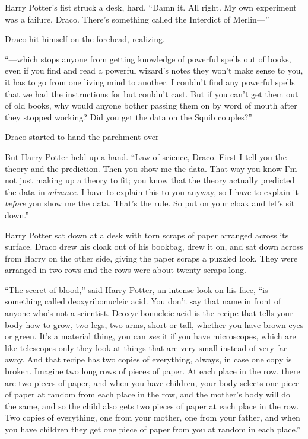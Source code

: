 Harry Potter’s fist struck a desk, hard. “Damn it. All right. My own experiment
was a failure, Draco. There’s something called the Interdict of Merlin—”

Draco hit himself on the forehead, realizing.

“—which stops anyone from getting knowledge of powerful spells out of books,
even if you find and read a powerful wizard’s notes they won’t make sense to
you, it has to go from one living mind to another. I couldn’t find any powerful
spells that we had the instructions for but couldn’t cast. But if you can’t get
them out of old books, why would anyone bother passing them on by word of mouth
after they stopped working? Did you get the data on the Squib couples?”

Draco started to hand the parchment over—

But Harry Potter held up a hand. “Law of science, Draco. First I tell you the
theory and the prediction. Then you show me the data. That way you know I’m not
just making up a theory to fit; you know that the theory actually predicted the
data in \emph{advance.} I have to explain this to you anyway, so I have to
explain it \emph{before} you show me the data. That’s the rule. So put on your
cloak and let’s sit down.”

Harry Potter sat down at a desk with torn scraps of paper arranged across its
surface. Draco drew his cloak out of his bookbag, drew it on, and sat down
across from Harry on the other side, giving the paper scraps a puzzled look.
They were arranged in two rows and the rows were about twenty scraps long.

“The secret of blood,” said Harry Potter, an intense look on his face, “is
something called deoxyribonucleic acid. You don’t say that name in front of
anyone who’s not a scientist. Deoxyribonucleic acid is the recipe that tells
your body how to grow, two legs, two arms, short or tall, whether you have
brown eyes or green. It’s a material thing, you can \emph{see} it if you have
microscopes, which are like telescopes only they look at things that are very
small instead of very far away. And that recipe has two copies of everything,
always, in case one copy is broken. Imagine two long rows of pieces of paper.
At each place in the row, there are two pieces of paper, and when you have
children, your body selects one piece of paper at random from each place in the
row, and the mother’s body will do the same, and so the child also gets two
pieces of paper at each place in the row. Two copies of everything, one from
your mother, one from your father, and when you have children they get one
piece of paper from you at random in each place.”

